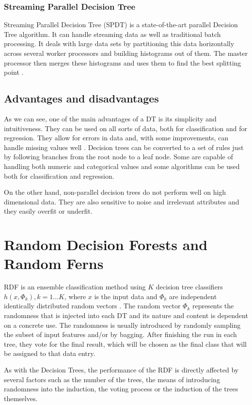 \documentclass[thesis=B,english]{FITthesis}[2012/10/20]
\begin{document}
		\subsection{Streaming Parallel Decision Tree}
		Streaming Parallel Decision Tree (SPDT) is a state-of-the-art parallel Decision Tree algorithm. It can handle streaming data as well as traditional batch processing. It deals with large data sets by partitioning this data horizontally across several worker processors and building histograms out of them. The master processor then merges these histograms and uses them to find the best splitting point \cite{ben2010streaming}. 

		\section{Advantages and disadvantages}
		As we can see, one of the main advantages of a DT is its simplicity and intuitiveness. They can be used on all sorts of data, both for classification and for regression. They allow for errors in data and, with some improvements, can handle missing values well \cite{DMWithDecisionTrees,CMP07}. Decision trees can be converted to a set of rules just by following branches from the root node to a leaf node. Some are capable of handling both numeric and categorical values and some algorithms can be used both for classification and regression.

		On the other hand, non-parallel decision trees do not perform well on high dimensional data. They are also sensitive to noise and irrelevant attributes and they easily overfit or underfit.
\chapter{Random Decision Forests and Random Ferns}
\label{chap:RDF}
	RDF is an ensemble classification method using \(K\) decision tree classifiers \({h(x, \Phi_k), k = 1\dots K} \), where \(x\) is the input data and \({\Phi_k}\) are independent identically distributed random vectors \cite{SELECTION_OF_DT}. The random vector \(\Phi_k\) represents the randomness that is injected into each DT and its nature and content is dependent on a concrete use. The randomness is usually introduced by randomly sampling the subset of input features and/or by bagging. After finishing the run in each tree, they vote for the final result, which will be chosen as the final class that will be assigned to that data entry.

	As with the Decision Trees, the performance of the RDF is directly affected by several factors such as the number of the trees, the means of introducing randomness into the induction, the voting process or the induction of the trees themselves.
\end{document}
